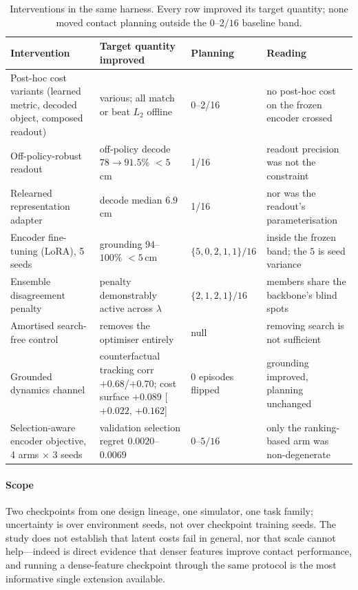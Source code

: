\documentclass[11pt,letterpaper]{article}
\begin{document}
\begin{table}[t]
\centering\footnotesize
\caption{Interventions in the same harness. Every row improved its target
quantity; none moved contact planning outside the $0$--$2/16$ baseline
band.}\label{tab:nulls}
\begin{tabularx}{\textwidth}{@{}L{3.5cm} L{4.5cm} L{2.3cm} Y@{}}
\toprule
Intervention & Target quantity improved & Planning & Reading \\
\midrule
Post-hoc cost variants (learned metric, decoded object, composed readout) &
various; all match or beat $L_2$ offline & 0--2/16 & no post-hoc cost on the
frozen encoder crossed \\
Off-policy-robust readout & off-policy decode $78 \rightarrow 91.5\%$ $<5$\,cm &
1/16 & readout precision was not the constraint \\
Relearned representation adapter & decode median $6.9$\,cm & 1/16 & nor was the
readout's parameterisation \\
Encoder fine-tuning (LoRA), 5 seeds & grounding $94$--$100\%$ $<5$\,cm &
$\{5,0,2,1,1\}/16$ & inside the frozen band; the $5$ is seed variance \\
Ensemble disagreement penalty & penalty demonstrably active across $\lambda$ &
$\{2,1,2,1\}/16$ & members share the backbone's blind spots \\
Amortised search-free control & removes the optimiser entirely & null & removing
search is not sufficient \\
Grounded dynamics channel & counterfactual tracking corr $+0.68$/$+0.70$; cost
surface $+0.089$ [$+0.022$, $+0.162$] & 0 episodes flipped & grounding improved,
planning unchanged \\
Selection-aware encoder objective, 4 arms $\times$ 3 seeds & validation selection
regret $0.0020$--$0.0069$ & $0$--$5/16$ & only the ranking-based arm was
non-degenerate \\
\bottomrule
\end{tabularx}
\end{table}

\paragraph{Scope}
Two checkpoints from one design lineage, one simulator, one task family;
uncertainty is over environment seeds, not over checkpoint training seeds. The
study does not establish that latent costs fail in general, nor that scale cannot
help---indeed \citet{murlabadia2026vjepa21} is direct evidence that denser
features improve contact performance, and running a dense-feature checkpoint
through the same protocol is the most informative single extension available.
\end{document}
